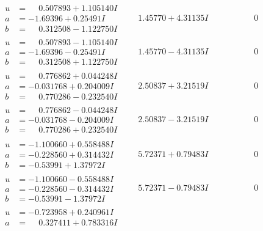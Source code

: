 \documentclass[1p]{elsarticle_modified}
\theoremstyle{definition}
\begin{document}
$$\begin{array}{c|c|c}
 \hline 
\begin{aligned}
u &= \phantom{-}0.507893 + 1.105140 I \\
a &= -1.69396 + 0.25491 I \\
b &= \phantom{-}0.312508 - 1.122750 I\end{aligned}
 & \phantom{-}1.45770 + 4.31135 I & \phantom{-0.000000 } 0 \\ \hline\begin{aligned}
u &= \phantom{-}0.507893 - 1.105140 I \\
a &= -1.69396 - 0.25491 I \\
b &= \phantom{-}0.312508 + 1.122750 I\end{aligned}
 & \phantom{-}1.45770 - 4.31135 I & \phantom{-0.000000 } 0 \\ \hline\begin{aligned}
u &= \phantom{-}0.776862 + 0.044248 I \\
a &= -0.031768 + 0.204009 I \\
b &= \phantom{-}0.770286 - 0.232540 I\end{aligned}
 & \phantom{-}2.50837 + 3.21519 I & \phantom{-0.000000 } 0 \\ \hline\begin{aligned}
u &= \phantom{-}0.776862 - 0.044248 I \\
a &= -0.031768 - 0.204009 I \\
b &= \phantom{-}0.770286 + 0.232540 I\end{aligned}
 & \phantom{-}2.50837 - 3.21519 I & \phantom{-0.000000 } 0 \\ \hline\begin{aligned}
u &= -1.100660 + 0.558488 I \\
a &= -0.228560 + 0.314432 I \\
b &= -0.53991 + 1.37972 I\end{aligned}
 & \phantom{-}5.72371 + 0.79483 I & \phantom{-0.000000 } 0 \\ \hline\begin{aligned}
u &= -1.100660 - 0.558488 I \\
a &= -0.228560 - 0.314432 I \\
b &= -0.53991 - 1.37972 I\end{aligned}
 & \phantom{-}5.72371 - 0.79483 I & \phantom{-0.000000 } 0 \\ \hline\begin{aligned}
u &= -0.723958 + 0.240961 I \\
a &= \phantom{-}0.327411 + 0.783316 I \\

\end{aligned}
\end{array}$$
\end{document}
